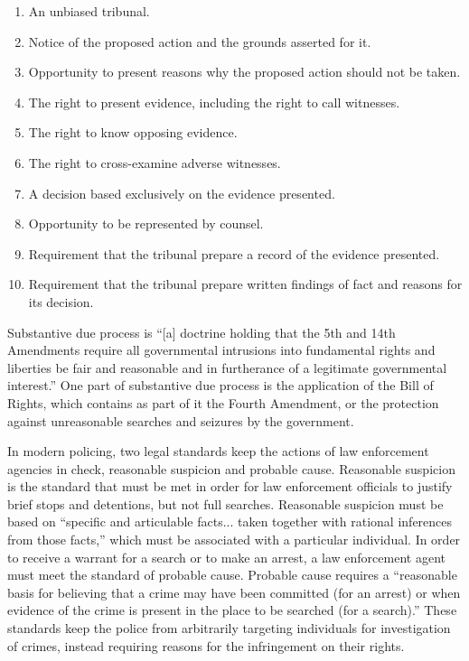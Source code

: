 \documentclass[12pt]{article} %
\begin{document}
\begin{enumerate}
\item An unbiased tribunal.
\item Notice of the proposed action and the grounds asserted for it.
\item Opportunity to present reasons why the proposed action should not be taken.
\item The right to present evidence, including the right to call witnesses.
\item The right to know opposing evidence.
\item The right to cross-examine adverse witnesses.
\item A decision based exclusively on the evidence presented.
\item Opportunity to be represented by counsel.
\item Requirement that the tribunal prepare a record of the evidence presented.
\item Requirement that the tribunal prepare written findings of fact and reasons for its decision.
\end{enumerate}

Substantive due process is ``[a] doctrine holding that the 5th and 14th Amendments require all governmental intrusions into fundamental rights and liberties be fair and reasonable and in furtherance of a legitimate governmental interest.'' \cite{wex_substantive} One part of substantive due process is the application of the Bill of Rights, which contains as part of it the Fourth Amendment, or the protection against unreasonable searches and seizures by the government.

In modern policing, two legal standards keep the actions of law enforcement agencies in check, reasonable suspicion and probable cause. Reasonable suspicion is the standard that must be met in order for law enforcement officials to justify brief stops and detentions, but not full searches. \cite{wex_suspicion} Reasonable suspicion must be based on ``specific and articulable facts... taken together with rational inferences from those facts,'' which must be associated with a particular individual. \cite{terry} In order to receive a warrant for a search or to make an arrest, a law enforcement agent must meet the standard of probable cause. Probable cause requires a ``reasonable basis for believing that a crime may have been committed (for an arrest) or when evidence of the crime is present in the place to be searched (for a search).'' \cite{wex_cause} These standards keep the police from arbitrarily targeting individuals for investigation of crimes, instead requiring reasons for the infringement on their rights.
\end{document}
